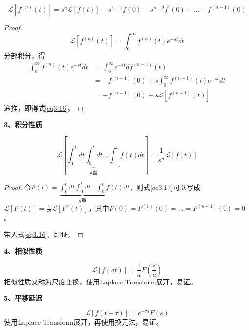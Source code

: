 \documentclass[lang=cn,10pt]{elegantbook}
\newcommand\mc[1]{\mathcal{#1}}
\begin{document}
\begin{equation}\label{eq3.16}
	\mathcal{L}\left[f^{(n)}\left(t\right)\right]=
	s^{n}\mathcal{L}\left[f\left(t\right)\right]-s^{n-1}f\left(0\right)-s^{n-2}f^{\prime}\left(0\right)-\ldots-f^{(n-1)}\left(0\right)
\end{equation}
\begin{proof}
	\begin{equation*}
		\mathcal{L}\left[f^{(n)}\left(t\right)\right]=\int_{0}^{\infty} f^{(n)}\left(t\right) e^{-st}dt
	\end{equation*}
	分部积分，得
	\begin{equation*}
		\begin{aligned}
			\int_{0}^{\infty} f^{(n)}\left(t\right) e^{-st}dt & = \int_{0}^{\infty} e^{-st}df^{(n-1)}(t)                     \\
			                                                  & =  -f^{(n-1)}(0) + s\int_{0}^{\infty} f^{(n-1)}(t) e^{-st}dt \\
			                                                  & = -f^{(n-1)}(0) + s\mc{L}[f^{(n-1)}(t)]
		\end{aligned}
	\end{equation*}
	递推，即得式\ref{eq3.16}。
\end{proof}

\textbf{3、积分性质}

\begin{equation}\label{eq3.17}
	\mathcal{L}\left[\underbrace{\int_0^tdt\int_0^tdt\ldots\int_0^t}_{n\text{重}} f \left ( t \right ) dt \right ]
	= \frac 1 {s^n}\mathcal{L}\left[f\left(t\right)\right]
\end{equation}
\begin{proof}
	令$F(t) = \underbrace{\int_0^tdt\int_0^tdt\ldots\int_0^t}_{n\text{重}} f \left ( t \right ) dt$，则式\ref{eq3.17}可以写成
	$\mc{L}[F(t)] = \frac1{s^n}\mc{L}[F^{n}(t)]$，其中$F(0)=F^{(1)}(0) = ... = F^{(n-1)}(0) = 0$。

	带入式\ref{eq3.16}，即证。
\end{proof}

\textbf{4、相似性质}

\begin{equation}
	\mathcal{L}[f(at)]=\frac1aF(\frac sa)
\end{equation}
相似性质又称为尺度变换，使用Laplace Transform展开，易证。

\textbf{5、平移延迟}

\begin{equation}
	\mathcal{L}[f(t-\tau)]=e^{-\tau s}F(s)
\end{equation}
使用Laplace Transform展开，再使用换元法，易证。
\end{document}
